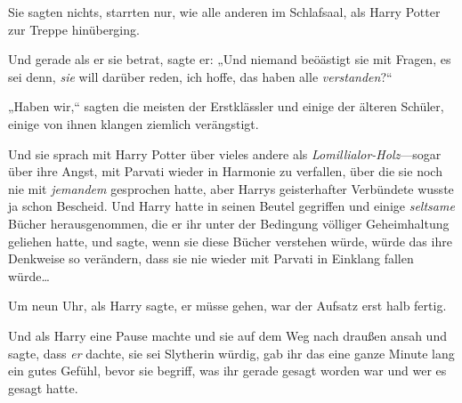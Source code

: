 Sie sagten nichts, starrten nur, wie alle anderen im Schlafsaal, als Harry Potter zur Treppe hinüberging.

Und gerade als er sie betrat, sagte er: „Und niemand beöästigt sie mit Fragen, es sei denn, \emph{sie} will darüber reden, ich hoffe, das haben alle \emph{verstanden}?“

„Haben wir,“ sagten die meisten der Erstklässler und einige der älteren Schüler, einige von ihnen klangen ziemlich verängstigt.

\later

Und sie sprach mit Harry Potter über vieles andere als \emph{Lomillialor-Holz}—sogar über ihre Angst, mit Parvati wieder in Harmonie zu verfallen, über die sie noch nie mit \emph{jemandem} gesprochen hatte, aber Harrys geisterhafter Verbündete wusste ja schon Bescheid. Und Harry hatte in seinen Beutel gegriffen und einige \emph{seltsame} Bücher herausgenommen, die er ihr unter der Bedingung völliger Geheimhaltung geliehen hatte, und sagte, wenn sie diese Bücher verstehen würde, würde das ihre Denkweise so verändern, dass sie nie wieder mit Parvati in Einklang fallen würde…

Um neun Uhr, als Harry sagte, er müsse gehen, war der Aufsatz erst halb fertig.

Und als Harry eine Pause machte und sie auf dem Weg nach draußen ansah und sagte, dass \emph{er} dachte, sie sei Slytherin würdig, gab ihr das eine ganze Minute lang ein gutes Gefühl, bevor sie begriff, was ihr gerade gesagt worden war und wer es gesagt hatte.

